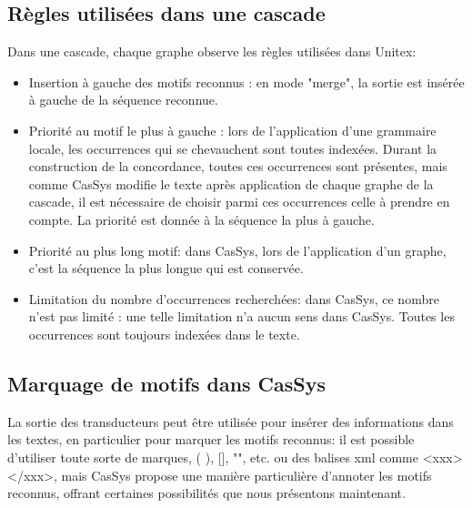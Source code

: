 \subsection{Règles utilisées dans une cascade}

Dans une cascade, chaque graphe observe les règles utilisées dans Unitex:
\begin{itemize}
	\item Insertion à gauche des motifs reconnus : en mode "merge", la sortie est insérée à
	gauche de la séquence reconnue.
	\item	Priorité au motif le plus à gauche : lors de l'application d'une grammaire locale,
	les occurrences qui se chevauchent sont toutes indexées. 
	Durant la construction de la concordance, toutes ces occurrences sont présentes, mais comme CasSys
	modifie le texte après application de chaque 
	graphe de la cascade, il est nécessaire de choisir parmi ces occurrences celle à prendre en
	compte. La priorité est donnée à la séquence la plus à gauche.
	\item Priorité au plus long motif: dans CasSys, lors de l'application d'un graphe, c'est la
	séquence la plus longue qui est conservée.
	\item	Limitation du nombre d'occurrences recherchées: dans CasSys, ce nombre n'est pas
	limité : une telle limitation n'a aucun sens dans CasSys. Toutes les occurrences sont
	toujours indexées dans le texte.
\end{itemize}

\subsection{Marquage de motifs dans CasSys}

La sortie des transducteurs peut être utilisée pour insérer des informations dans les textes, en
particulier pour marquer les motifs reconnus: il est possible d'utiliser toute sorte de marques, 
( ), [], "", etc. ou des balises xml comme <xxx> </xxx>, mais CasSys propose une manière
particulière d'annoter les motifs reconnus, offrant certaines possibilités que nous présentons
maintenant.  

